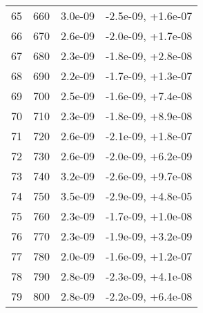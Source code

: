\begin{table}
\begin{adjustbox}{width=1\textwidth/2}
\begin{tabular}{|c|c|c|c|}
\cline{1-4}
65 & 660 & 3.0e-09 & -2.5e-09, +1.6e-07 \\
\cline{1-4}
66 & 670 & 2.6e-09 & -2.0e-09, +1.7e-08 \\
\cline{1-4}
67 & 680 & 2.3e-09 & -1.8e-09, +2.8e-08 \\
\cline{1-4}
68 & 690 & 2.2e-09 & -1.7e-09, +1.3e-07 \\
\cline{1-4}
69 & 700 & 2.5e-09 & -1.6e-09, +7.4e-08 \\
\cline{1-4}
70 & 710 & 2.3e-09 & -1.8e-09, +8.9e-08 \\
\cline{1-4}
71 & 720 & 2.6e-09 & -2.1e-09, +1.8e-07 \\
\cline{1-4}
72 & 730 & 2.6e-09 & -2.0e-09, +6.2e-09 \\
\cline{1-4}
73 & 740 & 3.2e-09 & -2.6e-09, +9.7e-08 \\
\cline{1-4}
74 & 750 & 3.5e-09 & -2.9e-09, +4.8e-05 \\
\cline{1-4}
75 & 760 & 2.3e-09 & -1.7e-09, +1.0e-08 \\
\cline{1-4}
76 & 770 & 2.3e-09 & -1.9e-09, +3.2e-09 \\
\cline{1-4}
77 & 780 & 2.0e-09 & -1.6e-09, +1.2e-07 \\
\cline{1-4}
78 & 790 & 2.8e-09 & -2.3e-09, +4.1e-08 \\
\cline{1-4}
79 & 800 & 2.8e-09 & -2.2e-09, +6.4e-08 \\
\cline{1-4}
\end{tabular}
\end{adjustbox}
\end{table}

